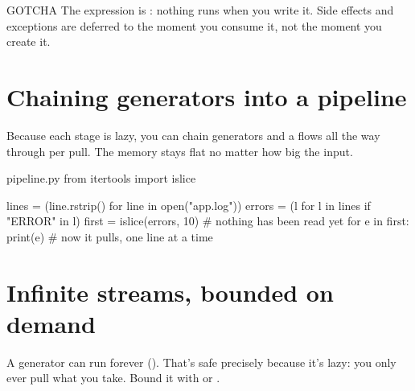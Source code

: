 \begin{callout}[dotamber]{GOTCHA}
The expression is : nothing runs when you write it. Side effects and exceptions are deferred to the moment you consume it, not the moment you create it.
\end{callout}

\section{Chaining generators into a pipeline}

Because each stage is lazy, you can chain generators and a  flows all the way through per pull. The memory stays flat no matter how big the input.

\begin{pycard}{pipeline.py}
from itertools import islice

lines  = (line.rstrip() for line in open("app.log"))
errors = (l for l in lines if "ERROR" in l)
first  = islice(errors, 10)          # nothing has been read yet
for e in first:
    print(e)                         # now it pulls, one line at a time
\end{pycard}

\begin{diagram}
\end{diagram}

\section{Infinite streams, bounded on demand}

A generator can run forever (). That's safe precisely because it's lazy: you only ever pull what you take. Bound it with  or .

